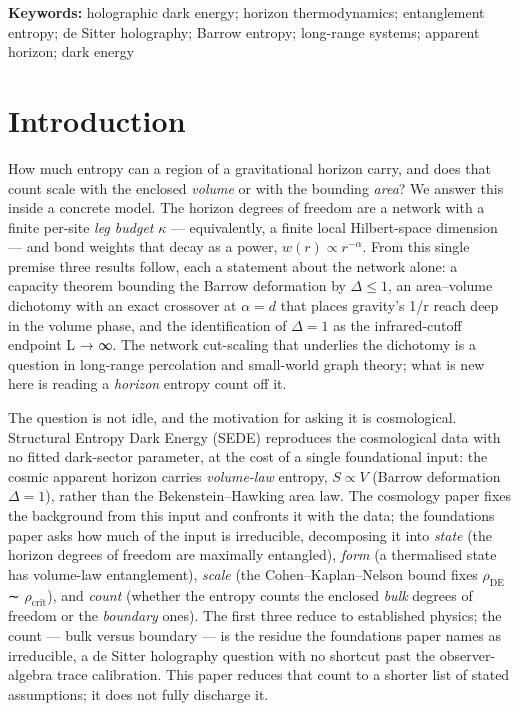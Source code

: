 \documentclass[aps,prd,preprint,nofootinbib,superscriptaddress]{revtex4-2}
\begin{document}
\maketitle

\noindent\textbf{Keywords:} holographic dark energy; horizon
thermodynamics; entanglement entropy; de Sitter holography; Barrow
entropy; long-range systems; apparent horizon; dark energy
\vspace{6pt}

\section{Introduction}\label{sec-1}

How much entropy can a region of a gravitational horizon carry, and does
that count scale with the enclosed \emph{volume} or with the bounding
\emph{area}? We answer this inside a concrete model. The horizon degrees
of freedom are a network with a finite per-site \emph{leg budget}
\(\kappa\) --- equivalently, a finite local Hilbert-space dimension ---
and bond weights that decay as a power, \(w(r) \propto  r^{-\alpha }\).
From this single premise three results follow, each a statement about
the network alone: a capacity theorem bounding the Barrow deformation by
\(\Delta  \leq  1\), an area--volume dichotomy with an exact crossover
at \(\alpha  = d\) that places gravity's 1/r reach deep in the volume
phase, and the identification of \(\Delta  = 1\) as the infrared-cutoff
endpoint L → ∞. The network cut-scaling that underlies the dichotomy is
a question in long-range percolation and small-world graph theory; what
is new here is reading a \emph{horizon} entropy count off it.

The question is not idle, and the motivation for asking it is
cosmological. Structural Entropy Dark Energy (SEDE) reproduces the
cosmological data with no fitted dark-sector parameter, at the cost of a
single foundational input: the cosmic apparent horizon carries
\emph{volume-law} entropy, \(S \propto  V\) (Barrow deformation
\(\Delta  = 1\)), rather than the Bekenstein--Hawking area law. The
cosmology paper \citep{Pandev:2026cosmology} fixes the background from
this input and confronts it with the data; the foundations paper
\citep{Pandev:2026foundations} asks how much of the input is
irreducible, decomposing it into \emph{state} (the horizon degrees of
freedom are maximally entangled), \emph{form} (a thermalised state has
volume-law entanglement), \emph{scale} (the Cohen--Kaplan--Nelson bound
fixes \(\rho _\mathrm{DE}\) ∼ \(\rho _{\mathrm{crit}}\)), and
\emph{count} (whether the entropy counts the enclosed \emph{bulk}
degrees of freedom or the \emph{boundary} ones). The first three reduce
to established physics; the count --- bulk versus boundary --- is the
residue the foundations paper names as irreducible, a de Sitter
holography question with no shortcut past the observer-algebra trace
calibration. This paper reduces that count to a shorter list of stated
assumptions; it does not fully discharge it.
\end{document}
